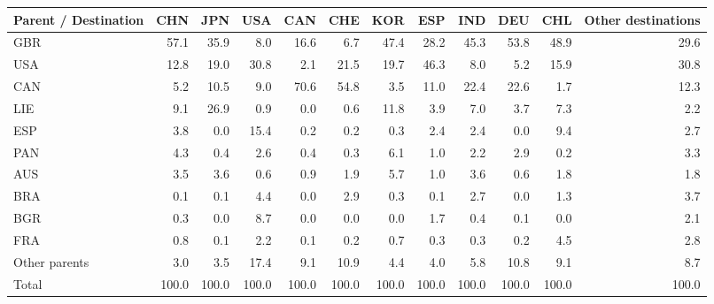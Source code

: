 \begin{tabular}{lrrrrrrrrrrr}
\toprule
Parent / Destination & CHN & JPN & USA & CAN & CHE & KOR & ESP & IND & DEU & CHL & Other destinations \\
\midrule
GBR & 57.1 & 35.9 & 8.0 & 16.6 & 6.7 & 47.4 & 28.2 & 45.3 & 53.8 & 48.9 & 29.6 \\
USA & 12.8 & 19.0 & 30.8 & 2.1 & 21.5 & 19.7 & 46.3 & 8.0 & 5.2 & 15.9 & 30.8 \\
CAN & 5.2 & 10.5 & 9.0 & 70.6 & 54.8 & 3.5 & 11.0 & 22.4 & 22.6 & 1.7 & 12.3 \\
LIE & 9.1 & 26.9 & 0.9 & 0.0 & 0.6 & 11.8 & 3.9 & 7.0 & 3.7 & 7.3 & 2.2 \\
ESP & 3.8 & 0.0 & 15.4 & 0.2 & 0.2 & 0.3 & 2.4 & 2.4 & 0.0 & 9.4 & 2.7 \\
PAN & 4.3 & 0.4 & 2.6 & 0.4 & 0.3 & 6.1 & 1.0 & 2.2 & 2.9 & 0.2 & 3.3 \\
AUS & 3.5 & 3.6 & 0.6 & 0.9 & 1.9 & 5.7 & 1.0 & 3.6 & 0.6 & 1.8 & 1.8 \\
BRA & 0.1 & 0.1 & 4.4 & 0.0 & 2.9 & 0.3 & 0.1 & 2.7 & 0.0 & 1.3 & 3.7 \\
BGR & 0.3 & 0.0 & 8.7 & 0.0 & 0.0 & 0.0 & 1.7 & 0.4 & 0.1 & 0.0 & 2.1 \\
FRA & 0.8 & 0.1 & 2.2 & 0.1 & 0.2 & 0.7 & 0.3 & 0.3 & 0.2 & 4.5 & 2.8 \\
Other parents & 3.0 & 3.5 & 17.4 & 9.1 & 10.9 & 4.4 & 4.0 & 5.8 & 10.8 & 9.1 & 8.7 \\
\midrule
Total & 100.0 & 100.0 & 100.0 & 100.0 & 100.0 & 100.0 & 100.0 & 100.0 & 100.0 & 100.0 & 100.0 \\
\bottomrule
\end{tabular}

